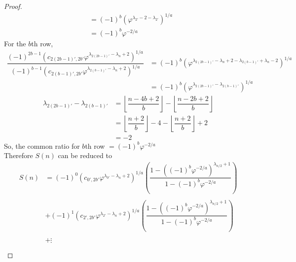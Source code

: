 \documentclass[preprint,12pt]{elsarticle}
\begin{document}
\begin{proof}
\begin{align*}
		                                                                                                                                                   & = (-1)^b\left(\varphi^{\lambda_{2'}-2-\lambda_{2'}}\right)^{1/a}                                \\
		                                                                                                                                                   & =(-1)^b \varphi^{-2/a}                                                                          
	\end{align*}
	For the $b$th row,
	\begin{align*}
		\dfrac{(-1)^{2b-1}(c_{2(2b-1)',2b'}\varphi^{\lambda_{2(2b-1)'}-\lambda_{n}+2})^{1/a}}{(-1)^{b-1}(c_{2(b-1)',2b'}\varphi^{\lambda_{2(b-1)'}-\lambda_{n}+2})^{1/a}} & = (-1)^b\left(\varphi^{\lambda_{2(2b-1)'}-\lambda_{n}+2-\lambda_{2(b-1)'}+\lambda_{n}-2}\right)^{1/a} \\
		                                                                                                                                                                  & = (-1)^b\left(\varphi^{\lambda_{2(2b-1)'}-\lambda_{2(b-1)'}}\right)^{1/a}                             
	\end{align*}
	\begin{align*}
		\lambda_{2(2b-1)'}-\lambda_{2(b-1)'} & = \left\lfloor\dfrac{n-4b+2}{b}\right\rfloor-\left\lfloor\dfrac{n-2b+2}{b}\right\rfloor \\&=\left\lfloor\dfrac{n+2}{b}\right\rfloor-4-\left\lfloor\dfrac{n+2}{b}\right\rfloor+2\\ &= -2
	\end{align*}
	So, the common ratio for $b$th row $=(-1)^b \varphi^{-2/a}$\\
	Therefore $S(n)$ can be reduced to
	\begin{align*}
		S(n) & =  (-1)^0(c_{0',2b'}\varphi^{\lambda_{0'}-\lambda_{n}+2})^{1/a}\left(\dfrac{1 - ((-1)^b\varphi^{-2/a})^{\lambda_{n/2}+1}}{1-(-1)^b\varphi^{-2/a}}\right)             \\\\
		     & +(-1)^1(c_{2',2b'}\varphi^{\lambda_{2'}-\lambda_{n}+2})^{1/a}\left(\dfrac{1 - ((-1)^b\varphi^{-2/a})^{\lambda_{n/2}+1}}{1-(-1)^b\varphi^{-2/a}}\right)               \\\\
		     & +\vdots                                                                                                                                                              \\\\

\end{align*}
\end{proof}
\end{document}
